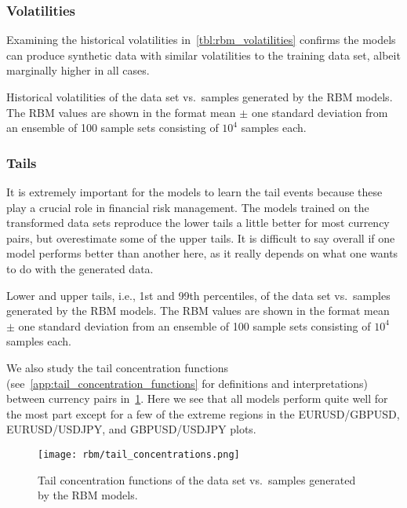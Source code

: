 \subsubsection{Volatilities}
Examining the historical volatilities in~\cref{tbl:rbm_volatilities} confirms the models can produce synthetic data with similar volatilities to the training data set, albeit marginally higher in all cases.
\begin{table}[!htb]
    \centering
    \begin{adjustbox}{max width=\textwidth}
        
    \end{adjustbox}
    \caption{Historical volatilities of the data set vs.~samples generated by the RBM models. The RBM values are shown in the format mean \(\pm\) one standard deviation from an ensemble of 100 sample sets consisting of \( 10^4 \) samples each.}
    \label{tbl:rbm_volatilities}
\end{table}

\subsubsection{Tails}
It is extremely important for the models to learn the tail events because these play a crucial role in financial risk management.
The models trained on the transformed data sets reproduce the lower tails a little better for most currency pairs, but overestimate some of the upper tails.
It is difficult to say overall if one model performs better than another here, as it really depends on what one wants to do with the generated data.
\begin{table}[!htb]
    \centering
    \begin{adjustbox}{max width=\textwidth}
        
    \end{adjustbox}
    \caption{Lower and upper tails, i.e., 1st and 99th percentiles, of the data set vs.~samples generated by the RBM models. The RBM values are shown in the format mean \(\pm\) one standard deviation from an ensemble of 100 sample sets consisting of \( 10^4 \) samples each.}
    \label{tbl:rbm_tails}
\end{table}

We also study the tail concentration functions (see~\cref{app:tail_concentration_functions} for definitions and interpretations) between currency pairs in~\cref{fig:rbm_tail_concentrations}.
Here we see that all models perform quite well for the most part except for a few of the extreme regions in the EURUSD/GBPUSD, EURUSD/USDJPY, and GBPUSD/USDJPY plots.
\begin{figure}[!htb]
    \begin{center}
        \texttt{[image: rbm/tail\_concentrations.png]}
    \end{center}
    \caption{Tail concentration functions of the data set vs.~samples generated by the RBM models.}
    \label{fig:rbm_tail_concentrations}
\end{figure}

